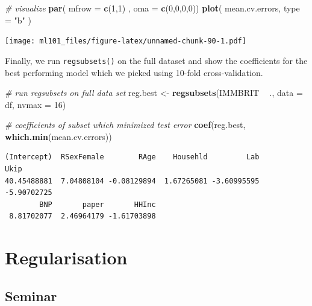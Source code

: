 \documentclass[]{article}
\newenvironment{Shaded}{\begin{snugshade}}{\end{snugshade}}
\newcommand{\CommentTok}[1]{\textcolor[rgb]{0.56,0.35,0.01}{\textit{#1}}}
\newcommand{\DataTypeTok}[1]{\textcolor[rgb]{0.13,0.29,0.53}{#1}}
\newcommand{\DecValTok}[1]{\textcolor[rgb]{0.00,0.00,0.81}{#1}}
\newcommand{\KeywordTok}[1]{\textcolor[rgb]{0.13,0.29,0.53}{\textbf{#1}}}
\newcommand{\NormalTok}[1]{#1}
\newcommand{\OperatorTok}[1]{\textcolor[rgb]{0.81,0.36,0.00}{\textbf{#1}}}
\newcommand{\StringTok}[1]{\textcolor[rgb]{0.31,0.60,0.02}{#1}}
\begin{document}
\begin{Shaded}
\begin{Highlighting}[]
\CommentTok{# visualize}
\KeywordTok{par}\NormalTok{( }\DataTypeTok{mfrow =} \KeywordTok{c}\NormalTok{(}\DecValTok{1}\NormalTok{,}\DecValTok{1}\NormalTok{) , }\DataTypeTok{oma =} \KeywordTok{c}\NormalTok{(}\DecValTok{0}\NormalTok{,}\DecValTok{0}\NormalTok{,}\DecValTok{0}\NormalTok{,}\DecValTok{0}\NormalTok{))}
\KeywordTok{plot}\NormalTok{( mean.cv.errors, }\DataTypeTok{type =} \StringTok{"b"}\NormalTok{ )}
\end{Highlighting}
\end{Shaded}

\texttt{[image: ml101\_files/figure-latex/unnamed-chunk-90-1.pdf]}

Finally, we run \texttt{regsubsets()} on the full dataset and show the coefficients for the best performing model which we picked using 10-fold cross-validation.

\begin{Shaded}
\begin{Highlighting}[]
\CommentTok{# run regsubsets on full data set}
\NormalTok{reg.best <-}\StringTok{ }\KeywordTok{regsubsets}\NormalTok{(IMMBRIT }\OperatorTok{~}\StringTok{ }\NormalTok{., }\DataTypeTok{data =}\NormalTok{ df, }\DataTypeTok{nvmax =} \DecValTok{16}\NormalTok{)}

\CommentTok{# coefficients of subset which minimized test error}
\KeywordTok{coef}\NormalTok{(reg.best, }\KeywordTok{which.min}\NormalTok{(mean.cv.errors))}
\end{Highlighting}
\end{Shaded}

\begin{verbatim}
(Intercept)  RSexFemale        RAge    Househld         Lab        Ukip 
40.45488881  7.04808104 -0.08129894  1.67265081 -3.60995595 -5.90702725 
        BNP       paper       HHInc 
 8.81702077  2.46964179 -1.61703898 
\end{verbatim}

\hypertarget{regularisation}{%
\section{Regularisation}\label{regularisation}}

\hypertarget{seminar-3}{%
\subsection{Seminar}\label{seminar-3}}
\end{document}
